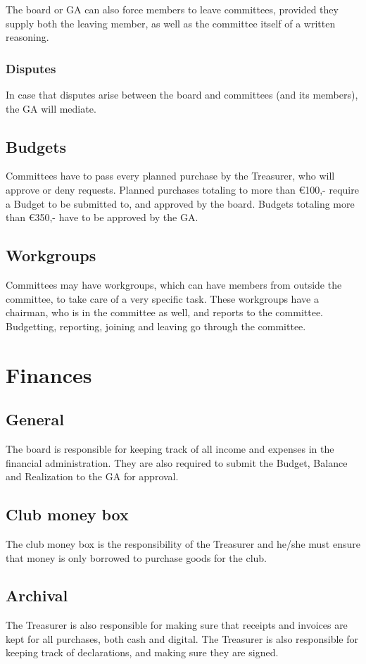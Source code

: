 \documentclass[a4paper]{article}
\begin{document}
The board or GA can also force members to leave committees, provided they supply both the leaving member, as well as the committee itself of a written reasoning.

\subsubsection{Disputes}
In case that disputes arise between the board and committees (and its members), the GA will mediate.

\subsection{Budgets}
Committees have to pass every planned purchase by the Treasurer, who will approve or deny requests. Planned purchases totaling to more than €100,- require a Budget to be submitted to, and approved by the board. Budgets totaling more than €350,- have to be approved by the GA.

\subsection{Workgroups}
Committees may have workgroups, which can have members from outside the committee, to take care of a very specific task. These workgroups have a chairman, who is in the committee as well, and reports to the committee. Budgetting, reporting, joining and leaving go through the committee.


\section{Finances}
\subsection{General}
The board is responsible for keeping track of all income and expenses in the financial administration. They are also required to submit the Budget, Balance and Realization to the GA for approval.

\subsection{Club money box}
The club money box is the responsibility of the Treasurer and he/she must ensure that money is only borrowed to purchase goods for the club.

\subsection{Archival}
The Treasurer is also responsible for making sure that receipts and invoices are kept for all purchases, both cash and digital. The Treasurer is also responsible for keeping track of declarations, and making sure they are signed.
\end{document}
